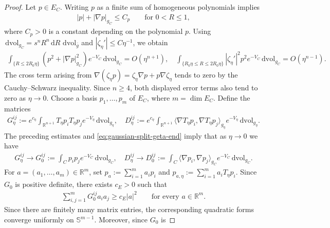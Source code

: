 \documentclass[11pt,reqno]{amsart}
\numberwithin{equation}{section}
\theoremstyle{definition}
\theoremstyle{remark}
\newcommand{\la}{\langle}
\newcommand{\ra}{\rangle}
\newcommand{\ud}{\mathrm{d}}
\newcommand{\0}{\emptyset}
\newcommand{\bbR}{\mathbb R}
\newcommand{\bbS}{\mathbb S}
\newcommand{\dvol}{\,\mathrm{dvol}}
\begin{document}
\begin{proof}
Let $p\in E_C$. Writing $p$ as a finite sum of homogeneous polynomials implies
\begin{align}\label{eq:gaussian-split-polynomial-tip-bound}
        |p|+|\nabla p|_{g_C}
        \leq
        C_p
        \qquad
        \text{for }0<R\leq1,
\end{align}
where $C_p>0$ is a constant depending on the polynomial $p.$ Using $\dvol_{g_C}=s^nR^n\,\ud R\,\dvol_{\bar g}$ and
$|\zeta_\eta'|\leq C\eta^{-1}$, we obtain
\begin{align}
        \int_{\{R\leq2R_0\eta\}}
        (p^2
        +
        |\nabla p|_{g_C}^2)e^{-V_C}\dvol_{g_C}
        =
        O(\eta^{n+1}),\quad 
        \int_{\{R_0\eta\leq R\leq2R_0\eta\}}
        |\zeta_\eta'|^2p^2e^{-V_C}\dvol_{g_C}
        =
        O(\eta^{n-1}).
\end{align}
The cross term arising from $\nabla(\zeta_\eta p)=\zeta_\eta\nabla p+p\nabla\zeta_\eta$ tends to zero by the Cauchy--Schwarz inequality. Since $n\geq4$, both displayed error terms also tend to zero as $\eta\to 0$. Choose a basis $p_1,\ldots,p_m$ of $E_C$, where $m=\dim E_C$. Define the matrices
\begin{align}
        G_\eta^{ij}
        :=
        e^{c_\eta}
        \int_{\bbR^{n+1}}
        T_\eta p_iT_\eta p_j
        e^{-V_\eta}\dvol_{g_\eta},\quad 
        D_\eta^{ij}
        :=
        e^{c_\eta}
        \int_{\bbR^{n+1}}
        \la\nabla T_\eta p_i,\nabla T_\eta p_j\ra_{g_\eta}
        e^{-V_\eta}\dvol_{g_\eta}.
\end{align}
The preceding estimates and \eqref{eq:gaussian-split-geta-end} imply that as $\eta \to 0$ we have
\begin{align}\label{eq:gaussian-split-L2-matrix-convergence}
        G_\eta^{ij}
        \rightarrow
        G_0^{ij}
        :=
        \int_Cp_ip_j e^{-V_C}\dvol_{g_C},\quad 
        D_\eta^{ij}
        \rightarrow
        D_0^{ij}
        :=
        \int_C
        \la\nabla p_i,\nabla p_j\ra_{g_C}
        e^{-V_C}\dvol_{g_C}.
\end{align}
For $a=(a_1,\ldots,a_m)\in\bbR^m$, set
$p_a:=\sum_{i=1}^ma_ip_i$ and
$p_{a,\eta}:=\sum_{i=1}^ma_iT_\eta p_i$. Since $G_0$ is positive definite,
there exists $c_E>0$ such that
\begin{align}
        \sum_{i,j=1}^mG_0^{ij}a_ia_j
        \geq
        c_E|a|^2
        \qquad
        \text{for every }a\in\bbR^m.
\end{align}
Since there are finitely many matrix entries, the corresponding quadratic
forms converge uniformly on $\bbS^{m-1}$. Moreover, since $G_0$ is

\end{proof}
\end{document}
